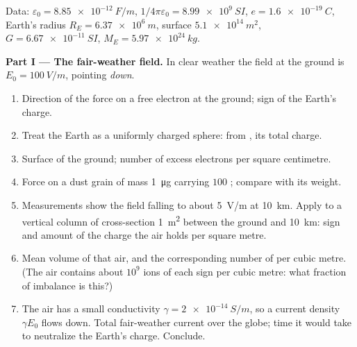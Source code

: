 \begin{problem}
\label{pb:b1:electrostatics-gauss:1}
Data: $\varepsilon_0 = \qty{8.85e-12}{F/m}$, $1/4\pi\varepsilon_0 = \qty{8.99e9}{SI}$,
$e = \qty{1.6e-19}{C}$, Earth's radius $R_E = \qty{6.37e6}{m}$, surface
$\qty{5.1e14}{m^2}$, $G = \qty{6.67e-11}{SI}$, $M_E = \qty{5.97e24}{kg}$.

\medskip
\noindent\textbf{Part I --- The fair-weather field.}
In clear weather the field at the ground is $E_0 = \qty{100}{V/m}$,
pointing \emph{down}.
\begin{enumerate}
  \item Direction of the force on a free electron at the ground; sign
        of the Earth's charge.
  \item Treat the Earth as a uniformly charged sphere: from ,
        its total charge.
  \item Surface  of the ground; number of excess electrons
        per square centimetre.
  \item Force on a dust grain of mass \qty{1}{\micro g} carrying $100$
        ; compare with its weight.
  \item Measurements show the field falling to about \qty{5}{V/m} at
        \qty{10}{km}. Apply  to a vertical column of
        cross-section \qty{1}{m^2} between the ground and \qty{10}{km}: sign
        and amount of the charge the air holds per square metre.
  \item Mean volume  of that air, and the corresponding
        number of  per cubic metre. (The air contains
        about $10^9$ ions of each sign per cubic metre: what fraction of
        imbalance is this?)
  \item The air has a small conductivity $\gamma = \qty{2e-14}{S/m}$, so a
        current density $\gamma E_0$ flows down. Total fair-weather
        current over the globe; time it would take to neutralize the
        Earth's charge. Conclude.
\end{enumerate}


\end{problem}
